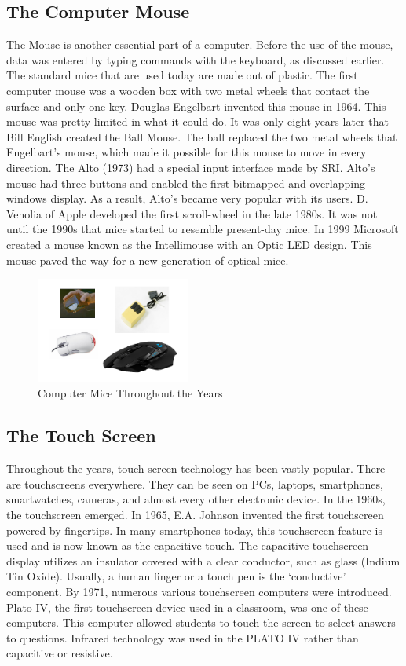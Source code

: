 \documentclass{article}
\begin{document}
\subsection{The Computer Mouse}
The Mouse is another essential part of a computer. Before the use of the mouse, data was entered by typing commands with the keyboard, as discussed earlier. The standard mice that are used today are made out of plastic. The first computer mouse was a wooden box with two metal wheels that contact the surface and only one key. Douglas Engelbart invented this mouse in 1964. This mouse was pretty limited in what it could do. It was only eight years later that Bill English created the Ball Mouse. The ball replaced the two metal wheels that Engelbart’s mouse, which made it possible for this mouse to move in every direction. The Alto (1973) had a special input interface made by SRI. Alto’s mouse had three buttons and enabled the first bitmapped and overlapping windows display. As a result, Alto’s became very popular with its users. D. Venolia of Apple developed the first scroll-wheel in the late 1980s. It was not until the 1990s that mice started to resemble present-day mice. In 1999 Microsoft created a mouse known as the Intellimouse with an Optic LED design. This mouse paved the way for a new generation of optical mice.
\cite{ref6} \cite{ref7}

\begin{figure}[!ht]
    \caption{Computer Mice Throughout the Years}
    \label{image:mice}
    \centering
    \includegraphics[width=0.45\textwidth]{pics/mice.png}
\end{figure}

\newpage
\subsection{The Touch Screen}
Throughout the years, touch screen technology has been vastly popular. There are touchscreens everywhere. They can be seen on PCs, laptops, smartphones, smartwatches, cameras, and almost every other electronic device. In the 1960s, the touchscreen emerged. In 1965, E.A.  Johnson invented the first touchscreen powered by fingertips. In many smartphones today, this touchscreen feature is used and is now known as the capacitive touch. The capacitive touchscreen display utilizes an insulator covered with a clear conductor, such as glass (Indium Tin Oxide).
Usually, a human finger or a touch pen is the ‘conductive’ component. By 1971, numerous various touchscreen computers were introduced. Plato IV, the first touchscreen device used in a classroom, was one of these computers. This computer allowed students to touch the screen to select answers to questions. Infrared technology was used in the PLATO IV rather than capacitive or resistive.
\cite{ref8}
\end{document}

